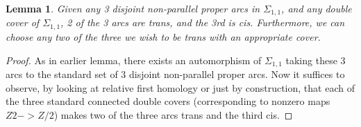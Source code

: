 \documentclass[12pt]{amsart}
\newtheorem{lemma}[theorem]{Lemma}
\theoremstyle{definition}
\newcommand{\Si}{\Sigma}
\begin{document}
\begin{lemma}

Given any 3 disjoint non-parallel proper arcs in $\Si_{1,1}$, and any double
cover of $\Si_{1,1}$, 2 of the 3 arcs are trans, and the 3rd is cis.
Furthermore, we can choose any two of the three we wish to be trans with an
appropriate cover.

\end{lemma}
\begin{proof}

As in earlier lemma, there exists an automorphism of $\Si_{1,1}$
taking these 3 arcs to the standard set of 3 disjoint non-parallel proper arcs.
Now it suffices to observe, by looking at relative first homology or just by
construction, that each of the three standard connected double covers
(corresponding to nonzero maps $Z2 -> Z/2$) makes two of the three arcs trans and
the third cis.

\end{proof}
\end{document}
